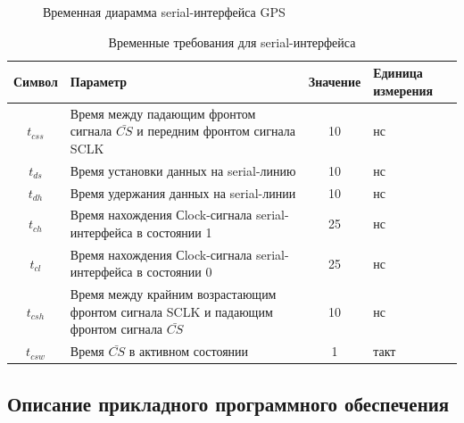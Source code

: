 \begin{figure}[h]
\caption{Временная диарамма serial-интерфейса GPS}
\label{pic:gps_serial}
\end{figure}

\begin{table}[h]
\caption{Временные требования для serial-интерфейса}
\label{tab:gps_serial}
\begin{tabular}{|c|p{250pt}|c|p{70pt}|}
 \hline  
  Символ & Параметр & Значение & Единица измерения  \\  
 \hline  
  $t_{css}$  & Время между падающим фронтом сигнала $\bar {CS}$ и передним фронтом сигнала SCLK	& 10 & нс  \\  
 \hline  
  $t_{ds}$   & Время установки данных на serial-линию	& 10 & нс \\  
 \hline  
  $t_{dh}$   & Время удержания данных на serial-линии	& 10 & нс \\  
 \hline  
  $t_{ch}$   & Время нахождения Сlock-сигнала serial-интерфейса в состоянии 1 & 25 & нс \\  
 \hline  
  $t_{cl}$   & Время нахождения Сlock-сигнала serial-интерфейса в состоянии 0 & 25 & нс \\  
 \hline  
  $t_{csh}$  & Время между крайним возрастающим фронтом сигнала SCLK и падающим фронтом сигнала $\bar {CS}$ & 10 & нс \\  
 \hline  
  $t_{csw}$  & Время $\bar {CS}$ в активном состоянии    & 1 & такт \\  
 \hline  
\end{tabular}
\end{table}


\subsection{Описание прикладного программного обеспечения}

\newpage
